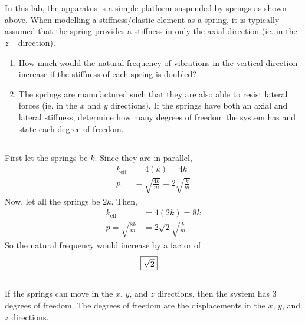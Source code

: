 \section{}
In this lab, the apparatus is a simple platform suspended by springs as shown above. When modelling a stiffness/elastic element as a spring, it is typically assumed that the spring provides a stiffness in only the axial direction (ie. in the $z$ – direction).
\begin{enumerate}[label=(\alph*)]
    \item How much would the natural frequency of vibrations in the vertical direction increase if the stiffness of each spring is doubled?
    \item The springs are manufactured such that they are also able to resist lateral forces (ie. in the $x$ and $y$ directions). If the springs have both an axial and lateral stiffness, determine how many degrees of freedom the system has and state each degree of freedom.
\end{enumerate}
\subsection*{}
First let the springs be $k$. Since they are in parallel,
\begin{align*}
    k_{\text{eff}} &= 4(k) = 4k \\
    p_1 &= \sqrt{\frac{4k}{m}} = 2\sqrt{\frac{k}{m}}
\end{align*}
Now, let all the springs be $2k$. Then,
\begin{align*}
    k_{\text{eff}} &= 4(2k) = 8k \\
    p = \sqrt{\frac{8k}{m}} &= 2\sqrt{2}\sqrt{\frac{k}{m}}
\end{align*}
So the natural frequency would increase by a factor of 
\begin{align*}
    \Aboxed{\sqrt{2}}
\end{align*}

\subsection{}
If the springs can move in the $x$, $y$, and $z$ directions, then the system has 3 degrees of freedom. The degrees of freedom are the displacements in the $x$, $y$, and $z$ directions.


